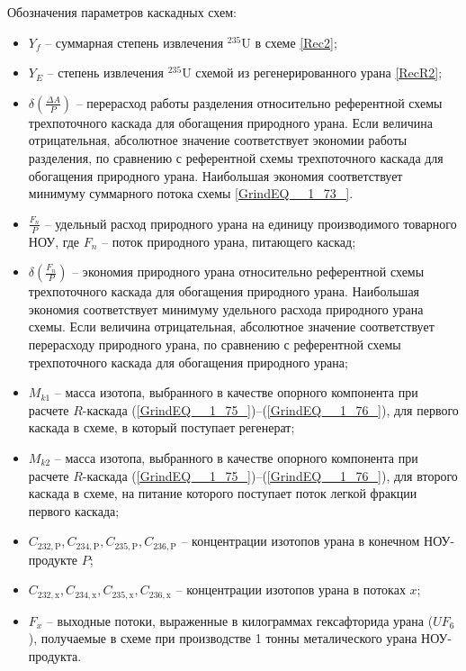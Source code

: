 Обозначения параметров каскадных схем:
\begin{itemize}
    \item $Y_f$ -- суммарная степень извлечения $^{235}$U в схеме \ref{Rec2};
    \item $Y_{E}$ -- степень извлечения $^{235}$U схемой из регенерированного урана \ref{RecR2};
    \item $\delta(\frac{\Delta A}{P})$ -- перерасход работы разделения относительно референтной схемы трехпоточного каскада для обогащения природного урана. Если величина отрицательная, абсолютное значение соответствует экономии работы разделения, по сравнению с референтной схемы трехпоточного каскада для обогащения природного урана. Наибольшая экономия соответствует минимуму суммарного потока схемы \ref{GrindEQ__1_73_}. 
    \item  $\frac{F_n}{P}$ -- удельный расход природного урана на единицу производимого товарного НОУ, где $F_n$ -- поток природного урана, питающего каскад;
    \item  $\delta(\frac{F_n}{P})$ -- экономия природного урана относительно референтной схемы трехпоточного каскада для обогащения природного урана.  Наибольшая экономия соответствует минимуму удельного расхода природного урана схемы. Если величина отрицательная, абсолютное значение соответствует перерасходу природного урана, по сравнению с референтной схемы трехпоточного каскада для обогащения природного урана;
    \item $M_{k1}$ -- масса изотопа, выбранного в качестве опорного компонента при расчете $R$-каскада (\ref{GrindEQ__1_75_})--(\ref{GrindEQ__1_76_}), для первого каскада в схеме, в который поступает регенерат;
    \item $M_{k2}$ -- масса изотопа, выбранного в качестве опорного компонента при расчете $R$-каскада (\ref{GrindEQ__1_75_})--(\ref{GrindEQ__1_76_}), для второго каскада в схеме, на питание которого поступает поток легкой фракции первого каскада;
    \item $C_{232,\text{P}},C_{234,\text{P}},C_{235,\text{P}},C_{236,\text{P}}$ -- концентрации изотопов урана в конечном НОУ-продукте $P$;
    \item $C_{232,\text{x}},C_{234,\text{x}},C_{235,\text{x}},C_{236,\text{x}}$ -- концентрации изотопов урана в потоках $x$;
    \item $F_{x}$ -- выходные потоки, выраженные в килограммах гексафторида урана ($UF_6$), получаемые в схеме при производстве 1 тонны металического урана НОУ-продукта.
  \end{itemize}
  
\addtocounter{table}{-1}%
